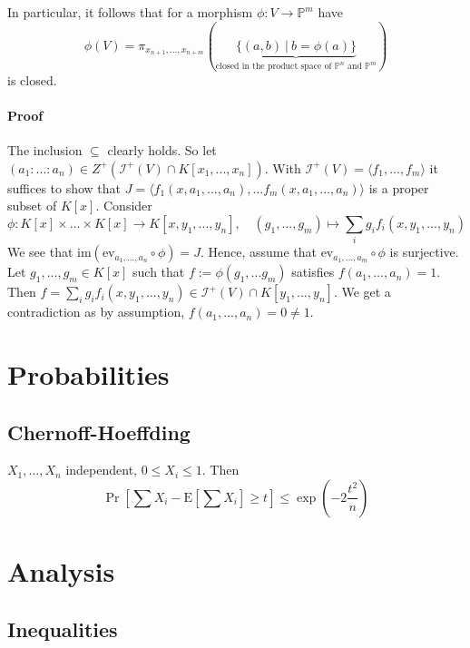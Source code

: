 \documentclass{scrartcl}
\newcommand{\Ex}{\mathrm{E}}
\begin{document}
In particular, it follows that for a morphism $\phi: V \to \mathbb{P}^m$ have \
\begin{equation*}
    \phi(V) = \pi_{x_{n + 1}, ..., x_{n + m}}(\underbrace{\{ (a, b) \ | \ b = \phi(a) \}}_{\text{closed in the product space of $\mathbb{P}^n$ and $\mathbb{P}^m$}})
\end{equation*}
is closed.

\paragraph{Proof} The inclusion $\subseteq$ clearly holds. 
So let $(a_1 : ... : a_n) \in Z^+(\mathcal{I}^+(V) \cap K[x_1, ..., x_n])$.
With $\mathcal{I}^+(V) = \langle f_1, ..., f_m \rangle$ it suffices to show that $J = \langle f_1(x, a_1, ..., a_n), ... f_m(x, a_1, ..., a_n) \rangle$ is a proper subset of $K[x]$.
Consider
\begin{equation*}
    \phi: K[x] \times ... \times K[x] \to K[x, y_1, ..., y_n], \quad (g_1, ..., g_m) \mapsto \sum_i g_i f_i(x, y_1, ..., y_n)
\end{equation*}
We see that $\mathrm{im}(\mathrm{ev}_{a_1, ..., a_n} \circ \phi) = J$. Hence, assume that $\mathrm{ev}_{a_1, ..., a_m} \circ \phi$ is surjective.
Let $g_1, ..., g_m \in K[x]$ such that $f := \phi(g_1, ... g_m)$ satisfies $f(a_1, ..., a_n) = 1$.
Then $f = \sum_i g_i f_i(x, y_1, ..., y_n) \in \mathcal{I}^+(V) \cap K[y_1, ..., y_n]$. We get a contradiction as by assumption, $f(a_1, ..., a_n) = 0 \neq 1$.

\section{Probabilities}

\subsection{Chernoff-Hoeffding}
$X_1, ..., X_n$ independent, $0 \leq X_i \leq 1$. Then
\begin{equation}
    \Pr\left[\sum X_i - \Ex\left[\sum X_i\right] \geq t\right] \leq \exp\left(-2\frac {t^2} n\right) \nonumber
\end{equation}

\section{Analysis}

\subsection{Inequalities}
\end{document}
